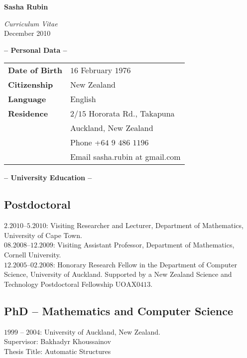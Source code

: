 \documentclass[a4paper]{article}
\def\tit#1{\medskip \begin{center}  {\Large {\bf -- #1 -- }} \end{center}}
\begin{document}
\begin{center}
{\Huge \bf Sasha Rubin}
\end{center}

\begin{center}
{\huge \it Curriculum Vitae} \\
\vspace{1em}
{\large December 2010}
\end {center}


\tit{Personal Data}
\begin{tabular}{@{}ll}

  \bf Date of Birth 
		 & $16$ February $1976$\\
  \bf Citizenship & New Zealand \\
  \bf Language   & English\\
  \bf Residence & $2/15$ Hororata Rd., Takapuna \\
  		 & Auckland, New Zealand\\
  \bf & Phone 	  +$64$ $9$ $486$ $1196$\\
   & Email   sasha.rubin at gmail.com
\end{tabular}

\tit{University Education}

\subsection*{Postdoctoral}

{$2.2010$--$5.2010$: Visiting Researcher and Lecturer, Department of Mathematics, University of Cape Town.}\\

{$08.2008$--$12.2009$: Visiting Assistant Professor, Department of Mathematics, Cornell University.} \\

{$12.2005$--$02.2008$: Honorary Research Fellow in the Department of Computer
Science, University of Auckland. Supported by a New Zealand Science and Technology Postdoctoral
Fellowship $\textrm{UOAX}0413$.}

\subsection*{{PhD -- Mathematics and Computer Science}}
{$1999$ -- $2004$: University of Auckland, New Zealand.\\
Supervisor: Bakhadyr Khoussainov\\
Thesis Title: Automatic Structures}
\end{document}
